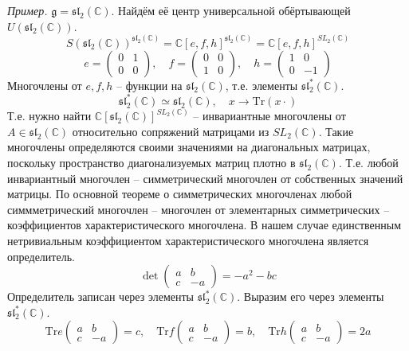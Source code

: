 \documentclass[12pt]{article}
\theoremstyle{definition}
\begin{document}
\textit{Пример.} $\mathfrak{g}=\mathfrak{sl}_2(\mathbb{C})$. Найдём её центр универсальной обёртывающей $U(\mathfrak{sl}_2(\mathbb{C}))$.
\begin{equation}
    S(\mathfrak{sl}_2(\mathbb{C}))^{\mathfrak{sl}_2(\mathbb{C})}=\mathbb{C}[e,f,h]^{\mathfrak{sl}_2(\mathbb{C})}=\mathbb{C}[e,f,h]^{SL_2(\mathbb{C})}
\end{equation}
\begin{equation}
    e=\begin{pmatrix}
        0 & 1\\
        0 & 0
    \end{pmatrix},\quad f=\begin{pmatrix}
        0 & 0\\
        1 & 0
    \end{pmatrix},\quad h=\begin{pmatrix}
        1 & 0\\
        0 & -1
    \end{pmatrix}
\end{equation}
Многочлены от $e,f,h$ -- функции на $\mathfrak{sl}_2(\mathbb{C})$, т.е. элементы $\mathfrak{sl}^*_2(\mathbb{C})$.
\begin{equation}
    \mathfrak{sl}^*_2(\mathbb{C})\simeq\mathfrak{sl}_2(\mathbb{C}),\quad x\rightarrow \text{Tr}(x\cdot)
\end{equation}
Т.е. нужно найти $\mathbb{C}[\mathfrak{sl}_2(\mathbb{C})]^{SL_2(\mathbb{C})}$ -- инвариантные многочлены от $A\in\mathfrak{sl}_2(\mathbb{C})$ относительно сопряжений матрицами из $SL_2(\mathbb{C})$. Такие многочлены определяются своими значениями на диагональных матрицах, поскольку  пространство диагонализуемых матриц плотно в $\mathfrak{sl}_2(\mathbb{C})$. Т.е. любой инвариантный многочлен -- симметрический многочлен от собственных значений матрицы. По основной теореме о симметрических многочленах любой симмметрический многочлен -- многочлен от элементарных симметрических -- коэффициентов характеристического многочлена. В нашем случае единственным нетривиальным коэффициентом характеристического многочлена является определитель.
\begin{equation}
    \det\begin{pmatrix}
    a & b\\
    c & -a
    \end{pmatrix}=-a^2-bc
\end{equation}
Определитель записан через элементы $\mathfrak{sl}^*_2(\mathbb{C})$. Выразим его через элементы $\mathfrak{sl}^*_2(\mathbb{C})$.
\begin{equation}
    \text{Tr}e\begin{pmatrix}
        a & b\\
        c & -a
    \end{pmatrix}=c,\quad\text{Tr}f\begin{pmatrix}
        a & b\\
        c & -a
    \end{pmatrix}=b,\quad \text{Tr}h\begin{pmatrix}
        a & b\\
        c & -a
    \end{pmatrix}=2a
\end{equation}
\end{document}
